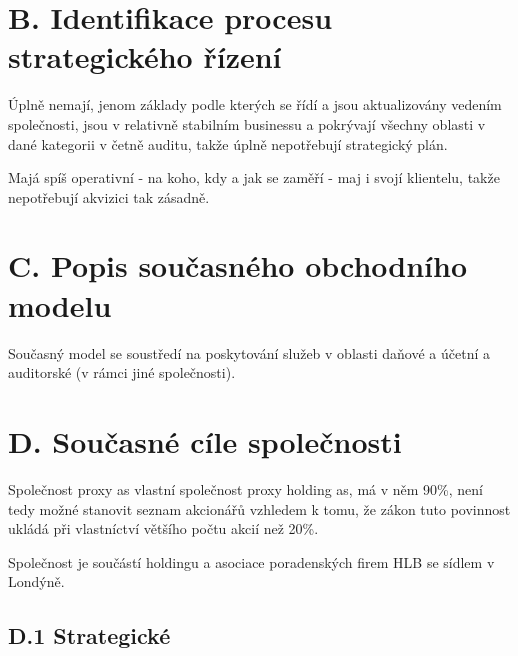 \section*{B. Identifikace procesu strategického řízení}
\label{sec:Identifikace procesu strategickeho rizeni}

Úplně nemají, jenom základy podle kterých se řídí a jsou aktualizovány vedením společnosti, jsou v relativně stabilním businessu a pokrývají všechny oblasti v dané kategorii v četně auditu, takže úplně nepotřebují strategický plán.

Majá spíš operativní - na koho, kdy a jak se zaměří - maj i svojí klientelu, takže nepotřebují akvizici tak zásadně.

\section*{C. Popis současného obchodního modelu}
\label{sec:Popis soucasneho obchodniho modelu}

Současný model se soustředí na poskytování služeb v oblasti daňové a účetní a auditorské (v rámci jiné společnosti).

\newpage


\section*{D. Současné cíle společnosti}
\label{sec:Soucasne cile spolecnosti}

Společnost proxy as vlastní společnost proxy holding as, má v něm 90\%, není tedy možné stanovit seznam akcionářů vzhledem k tomu, že zákon tuto povinnost ukládá při vlastníctví většího počtu akcií než 20\%.

Společnost je součástí holdingu a asociace poradenských firem HLB se sídlem v Londýně.

\subsection*{D.1 Strategické}
\label{sec:Strategicke}

